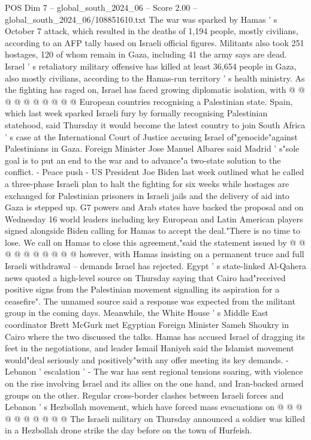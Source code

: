 \begin{textsample}{POS Dim 7 – global\_south\_2024\_06 – Score 2.00 – global\_south\_2024\_06/108851610.txt}
The war was sparked by Hamas ' s October 7 attack, which resulted in the deaths of 1,194 people, mostly civilians, according to an AFP tally based on Israeli official figures.
Militants also took 251 hostages, 120 of whom remain in Gaza, including 41 the army says are dead.
Israel ' s retaliatory military offensive has killed at least 36,654 people in Gaza, also mostly civilians, according to the Hamas-run territory ' s health ministry.
As the fighting has raged on, Israel has faced growing diplomatic isolation, with @ @ @ @ @ @ @ @ @ @ European countries recognising a Palestinian state.
Spain, which last week sparked Israeli fury by formally recognising Palestinian statehood, said Thursday it would become the latest country to join South Africa ' s case at the International Court of Justice accusing Israel of"genocide"against Palestinians in Gaza.
Foreign Minister Jose Manuel Albares said Madrid ' s"sole goal is to put an end to the war and to advance"a two-state solution to the conflict. - Peace push - US President Joe Biden last week outlined what he called a three-phase Israeli plan to halt the fighting for six weeks while hostages are exchanged for Palestinian prisoners in Israeli jails and the delivery of aid into Gaza is stepped up.
G7 powers and Arab states have backed the proposal and on Wednesday 16 world leaders including key European and Latin American players signed alongside Biden calling for Hamas to accept the deal."There is no time to lose.
We call on Hamas to close this agreement,"said the statement issued by @ @ @ @ @ @ @ @ @ @ however, with Hamas insisting on a permanent truce and full Israeli withdrawal -- demands Israel has rejected.
Egypt ' s state-linked Al-Qahera news quoted a high-level source on Thursday saying that Cairo had"received positive signs from the Palestinian movement signalling its aspiration for a ceasefire".
The unnamed source said a response was expected from the militant group in the coming days.
Meanwhile, the White House ' s Middle East coordinator Brett McGurk met Egyptian Foreign Minister Sameh Shoukry in Cairo where the two discussed the talks.
Hamas has accused Israel of dragging its feet in the negotiations, and leader Ismail Haniyeh said the Islamist movement would"deal seriously and positively"with any offer meeting its key demands. - Lebanon ' escalation ' - The war has sent regional tensions soaring, with violence on the rise involving Israel and its allies on the one hand, and Iran-backed armed groups on the other.
Regular cross-border clashes between Israeli forces and Lebanon ' s Hezbollah movement, which have forced mass evacuations on @ @ @ @ @ @ @ @ @ @ The Israeli military on Thursday announced a soldier was killed in a Hezbollah drone strike the day before on the town of Hurfeish.

\end{textsample}
